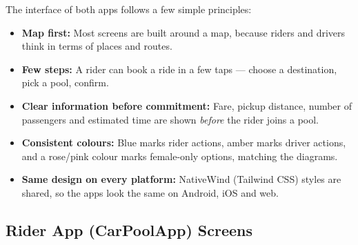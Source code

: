 The interface of both apps follows a few simple principles:

\begin{itemize}
  \item \textbf{Map first:} Most screens are built around a map, because riders
        and drivers think in terms of places and routes.
  \item \textbf{Few steps:} A rider can book a ride in a few taps --- choose a
        destination, pick a pool, confirm.
  \item \textbf{Clear information before commitment:} Fare, pickup distance,
        number of passengers and estimated time are shown \emph{before} the
        rider joins a pool.
  \item \textbf{Consistent colours:} Blue marks rider actions, amber marks
        driver actions, and a rose/pink colour marks female-only options,
        matching the diagrams.
  \item \textbf{Same design on every platform:} NativeWind (Tailwind CSS)
        styles are shared, so the apps look the same on Android, iOS and web.
\end{itemize}

\subsection{Rider App (CarPoolApp) Screens}


